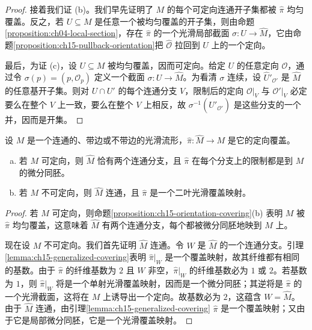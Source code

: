 \documentclass[../../main.tex]{subfiles}
\begin{document}
\begin{proof}
接着我们证 (b)。我们早先证明了 $M$ 的每个可定向连通开子集都被 $\widehat\pi$ 均匀覆盖。反之，若 $U\subseteq M$ 是任意一个被均匀覆盖的开子集，则由命题\ref{proposition:ch04-local-section}，存在 $\widehat\pi$ 的一个光滑局部截面 $\sigma:U\to\widehat M$，它由命题\ref{proposition:ch15-pullback-orientation}把 $\widehat{\mathcal O}$ 拉回到 $U$ 上的一个定向。

最后，为证 (c)，设 $U\subseteq M$ 被均匀覆盖，因而可定向。给定 $U$ 的任意定向 $\mathcal O$，通过令 $\sigma(p)=(p,\mathcal O_p)$ 定义一个截面 $\sigma:U\to\widehat M$。为看清 $\sigma$ 连续，设 $\widehat U'_{\mathcal O'}$ 是 $\widehat M$ 的任意基开子集。则对 $U\cap U'$ 的每个连通分支 $V$，限制后的定向 $\mathcal O|_V$ 与 $\mathcal O'|_V$ 必定要么在整个 $V$ 上一致，要么在整个 $V$ 上相反，故 $\sigma^{-1}(\widehat U'_{\mathcal O'})$ 是这些分支的一个并，因而是开集。
\end{proof}

\begin{theorem}[定向覆盖定理]\label{theorem:ch15-orientation-covering-theorem}
设 $M$ 是一个连通的、带边或不带边的光滑流形，$\widehat\pi:\widehat M\to M$ 是它的定向覆盖。
\begin{enumerate}[(a)]
\item 若 $M$ 可定向，则 $\widehat M$ 恰有两个连通分支，且 $\widehat\pi$ 在每个分支上的限制都是到 $M$ 的微分同胚。
\item 若 $M$ 不可定向，则 $\widehat M$ 连通，且 $\widehat\pi$ 是一个二叶光滑覆盖映射。
\end{enumerate}
\end{theorem}

\begin{proof}
若 $M$ 可定向，则命题\ref{proposition:ch15-orientation-covering}(b) 表明 $M$ 被 $\widehat\pi$ 均匀覆盖，这意味着 $\widehat M$ 有两个连通分支，每个都被微分同胚地映到 $M$ 上。

现在设 $M$ 不可定向。我们首先证明 $\widehat M$ 连通。令 $W$ 是 $\widehat M$ 的一个连通分支。引理\ref{lemma:ch15-generalized-covering}表明 $\widehat\pi|_W$ 是一个覆盖映射，故其纤维都有相同的基数。由于 $\widehat\pi$ 的纤维基数为 $2$ 且 $W$ 非空，$\widehat\pi|_W$ 的纤维基数必为 $1$ 或 $2$。若基数为 $1$，则 $\widehat\pi|_W$ 将是一个单射光滑覆盖映射，因而是一个微分同胚；其逆将是 $\widehat\pi$ 的一个光滑截面，这将在 $M$ 上诱导出一个定向。故基数必为 $2$，这蕴含 $W=\widehat M$。由于 $\widehat M$ 连通，由引理\ref{lemma:ch15-generalized-covering} $\widehat\pi$ 是一个覆盖映射；又由于它是局部微分同胚，它是一个光滑覆盖映射。
\end{proof}
\end{document}

